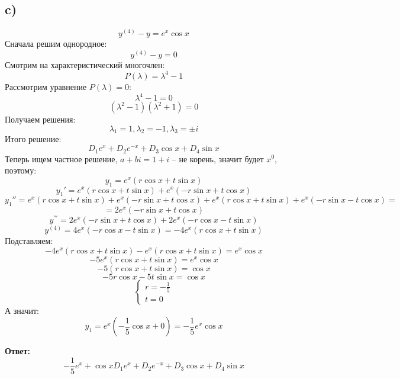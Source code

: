 \documentclass[a4paper, 12pt]{article}
\begin{document}
\subsection*{c)}
\[
y^{(4)} - y = e^x \cos x 
\]
Сначала решим однородное:
\[
y^{(4)} - y = 0
\]
Смотрим на характеристический многочлен:
\[
P(\lambda) = \lambda^4 - 1 
\]
Рассмотрим уравнение $P(\lambda) = 0$:
\[
 \lambda^4 - 1 = 0
\]
\[
(\lambda^2 - 1) (\lambda^2 + 1 ) = 0
\]
Получаем решения:
\[
\lambda_1 = 1, \lambda_2 = -1, \lambda_3 = \pm i 
\]
Итого решение:
\[
D_1 e^{x} + D_2 e^{-x} + D_3 \cos x + D_4 \sin x
\]
Теперь ищем частное решение, $a + bi =1 +  i$ -- не корень, значит будет $x^0$, поэтому:
\[
y_1 = e^x (r \cos x + t \sin x)
\]
\[
y_1 ' = e^x (r \cos x + t \sin x) + e^x (-r \sin x + t \cos x)
\]
\[
y_1'' =  e^x (r \cos x + t \sin x) + e^x (-r \sin x + t \cos x) +  e^x (r \cos x + t \sin x) + e^x (-r \sin x - t \cos x)
=
\]
\[
=
2 e^x(-r \sin x  + t \cos x)
\]
\[
y^{'''} = 2 e^x(-r \sin x  + t \cos x) + 2 e^x(-r \cos x  - t \sin x) 
\]
\[
y^{(4)} = 4e^x (-r \cos x - t \sin x) = -4e^x (r \cos x + t \sin x)
\]
Подставляем:
\[
-4e^x (r \cos x + t \sin x) - e^x (r \cos x + t \sin x) = e^x \cos x 
\]
\[
-5 e^x (r \cos x + t \sin x) = e^x \cos x 
\]
\[
- 5 (r \cos x + t \sin x) = \cos x
\]
\[
-5 r \cos x -5 t \sin x = \cos x
\]
\[
\begin{cases}
r = -\frac{1}{5} \\
t = 0
\end{cases}
\]
А значит:
\[
y_1 = e^x(-\frac{1}{5}\cos x + 0 ) = -\frac{1}{5}e^x \cos x
\]
\begin{center}
\textbf{Ответ: } 
\[
-\frac{1}{5}e^x + \cos xD_1 e^{x} + D_2 e^{-x} + D_3 \cos x + D_4 \sin x
\]
\end{center}
\clearpage
\end{document}
